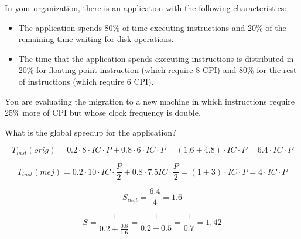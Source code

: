 \begin{acexercise}\end{acexercise}

In your organization, there is an application with the following characteristics:

\begin{itemize}

\item The application spends 80\% of time executing instructions and 20\% of the remaining time
waiting for disk operations.

\item The time that the application spends executing instructions is distributed
in 20\% for floating point instruction (which require 8 CPI)
and 80\% for the rest of instructions (which require 6 CPI).

\end{itemize}

You are evaluating the migration to a new machine in which instructions
require 25\% more of CPI but whose clock frequency is double.

What is the global speedup for the application?


\begin{acsolution}\end{acsolution}

\[ 
T_{inst}(orig) = 
0.2 \cdot 8 \cdot IC \cdot P+ 0.8 \cdot 6 \cdot IC \cdot P = 
(1.6 + 4.8) \cdot IC \cdot P = 
6.4 \cdot IC \cdot P 
\]

\[ 
T_{inst}(mej) = 
0.2 \cdot 10 \cdot IC \cdot \frac{P}{2} + 0.8 \cdot 7.5 IC \cdot \frac{P}{2} = 
(1 + 3) \cdot IC \cdot P = 
4 \cdot IC \cdot P 
\]

\[ 
S_{inst} = 
\frac{6.4}{4} = 
1.6 
\]

\[ 
S = 
\frac{1}{0.2 + \frac{0.8}{1.6}} = 
\frac{1}{0.2 + 0.5} = 
\frac{1}{0.7} =1,42 
\]

